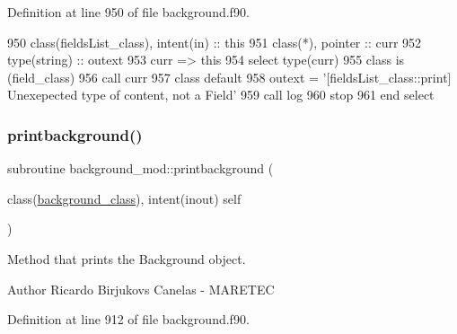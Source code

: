 Definition at line 950 of file background.\+f90.


\begin{DoxyCode}
950     \textcolor{keywordtype}{class}(fieldsList\_class), \textcolor{keywordtype}{intent(in)} :: this
951     \textcolor{keywordtype}{class}(*), \textcolor{keywordtype}{pointer} :: curr
952     \textcolor{keywordtype}{type}(string) :: outext
953     curr => this%
954     \textcolor{keywordflow}{select type}(curr)
955 \textcolor{keywordflow}{    class is} (field\_class)
956         \textcolor{keyword}{call }curr%
957 \textcolor{keywordflow}{        class default}
958         outext = \textcolor{stringliteral}{'[fieldsList\_class::print] Unexepected type of content, not a Field'}
959         \textcolor{keyword}{call }log%
960         stop
961 \textcolor{keywordflow}{    end select}
\end{DoxyCode}
\mbox{\label{namespacebackground__mod_a8a8f225cffcddb742f22a402155b703f}} 
\subsubsection{\texorpdfstring{printbackground()}{printbackground()}}
{\footnotesize\ttfamily subroutine background\+\_\+mod\+::printbackground (\begin{DoxyParamCaption}\item[{class(\mbox{\hyperlink{structbackground__mod_1_1background__class}{background\+\_\+class}}), intent(inout)}]{self }\end{DoxyParamCaption})\hspace{0.3cm}{\ttfamily [private]}}



Method that prints the Background object. 

\begin{DoxyAuthor}{Author}
Ricardo Birjukovs Canelas -\/ M\+A\+R\+E\+T\+EC 
\end{DoxyAuthor}


Definition at line 912 of file background.\+f90.


